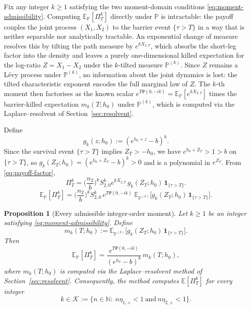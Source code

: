 \documentclass[11pt]{article}
\newcommand{\E}{\mathbb{E}}
\renewcommand{\P}{\mathbb{P}}
\newcommand{\one}{\mathbf{1}}
\theoremstyle{plain}
\newtheorem{proposition}[theorem]{Proposition}
\theoremstyle{definition}
\theoremstyle{remark}
\begin{document}
Fix any integer $k\ge1$ satisfying the two moment-domain conditions
\eqref{eq:moment-admissibility}. Computing
$\E_\P[\Pi_T^k]$ directly under $\P$ is intractable: the payoff couples the joint
process $(X_1,X_2)$ to the barrier event $\{\tau>T\}$ in a way that is neither separable nor
analytically tractable. An exponential change of measure resolves this by tilting the path measure by
$e^{kX_{2,T}}$, which absorbs the short-leg factor into the density and leaves a purely one-dimensional
killed expectation for the log-ratio $Z=X_1-X_2$ under the $k$-tilted measure $\P^{(k)}$. Since $Z$
remains a L\'{e}vy process under $\P^{(k)}$, no information about the joint dynamics is lost: the
tilted characteristic exponent encodes the full marginal law of $Z$. The $k$-th moment then factorises
as the known scalar $e^{T\Psi(0,-ik)}=\E_\P[e^{kX_{2,T}}]$ times the barrier-killed expectation
$m_k(T;h_0)$ under $\P^{(k)}$, which is computed via the Laplace--resolvent of
Section~\ref{sec:resolvent}.

Define
\[
g_k(z;h_0):=(e^{h_0+z}-b)^k.
\]
Since the survival event $\{\tau>T\}$ implies $Z_T>-h_0$, we have $e^{h_0+Z_T}>1>b$ on $\{\tau>T\}$, so $g_k(Z_T;h_0)=(e^{h_0+Z_T}-b)^k>0$ and is a polynomial in $e^{Z_T}$.
From \eqref{eq:payoff-factor},
\[
\Pi_T^k
=
\Big(\frac{n_2}{b}\Big)^k S_{2,0}^k e^{kX_{2,T}}\,g_k(Z_T;h_0)\,\one_{\{\tau>T\}}.
\]
\begin{equation}\label{eq:moment-reduction}
\E_{\P}[\Pi_T^k]
=
\Big(\frac{n_2}{b}\Big)^k S_{2,0}^k\,e^{T\Psi(0,-ik)}\;
\E_{\P^{(k)}}\!\Big[g_k(Z_T;h_0)\,\one_{\{\tau>T\}}\Big].
\end{equation}

\begin{proposition}[Every admissible integer-order moment]\label{prop:integer-moments}
Let $k\ge 1$ be an integer satisfying \eqref{eq:moment-admissibility}. Define
\[
m_k(T;h_0):=\E_{\P^{(k)}}\!\Big[g_k(Z_T;h_0)\,\one_{\{\tau>T\}}\Big].
\]
Then
\[
\E_{\P}[\Pi_T^k]=\frac{e^{T\Psi(0,-ik)}}{(e^{h_0}-b)^k}\,m_k(T;h_0),
\]
where $m_k(T;h_0)$ is computed via the Laplace--resolvent method of
Section~\ref{sec:resolvent}. Consequently, the method computes $\E[\Pi_T^k]$ for every
integer
\[
k\in\mathcal K:=
\{n\in\mathbb N:\ n\eta_{1,+}<1\ \text{and}\ n\eta_{2,+}<1\}.
\]
\end{proposition}
\end{document}
